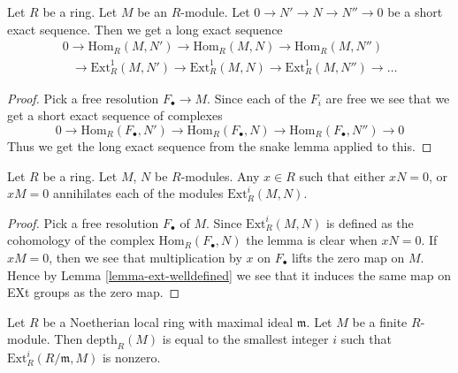 \begin{lemma}
\label{lemma-long-exact-seq-ext}
Let $R$ be a ring. Let $M$ be an $R$-module.
Let $0 \to N' \to N \to N'' \to 0$ be a 
short exact sequence. Then we get a long exact
sequence
$$
\begin{matrix}
0
\to \text{Hom}_R(M, N')
\to \text{Hom}_R(M, N)
\to \text{Hom}_R(M, N'')
\\
\phantom{0\ }
\to \text{Ext}^1_R(M, N')
\to \text{Ext}^1_R(M, N)
\to \text{Ext}^1_R(M, N'')
\to \ldots
\end{matrix}
$$
\end{lemma}

\begin{proof}
Pick a free resolution $F_{\bullet} \to M$.
Since each of the $F_i$ are free we see that 
we get a short exact sequence of complexes
$$
0 \to
\text{Hom}_R(F_{\bullet}, N') \to
\text{Hom}_R(F_{\bullet}, N) \to
\text{Hom}_R(F_{\bullet}, N'') \to
0
$$
Thus we get the long exact sequence from
the snake lemma applied to this.
\end{proof}

\begin{lemma}
\label{lemma-annihilate-ext}
Let $R$ be a ring. Let $M$, $N$ be $R$-modules.
Any $x\in R$ such that either $xN = 0$, or $xM = 0$
annihilates each of the modules $\text{Ext}^i_R(M,N)$.
\end{lemma}

\begin{proof}
Pick a free resolution $F_{\bullet}$ of $M$.
Since $\text{Ext}^i_R(M, N)$
is defined as the cohomology of the complex
$\text{Hom}_R(F_{\bullet}, N)$ the lemma is
clear when $xN = 0$. If $xM = 0$, then 
we see that multiplication by $x$ on $F_{\bullet}$
lifts the zero map on $M$. Hence by Lemma
\ref{lemma-ext-welldefined} we see that it
induces the same map on EXt groups as the
zero map.
\end{proof}

\begin{lemma}
\label{lemma-depth-ext}
Let $R$ be a Noetherian local ring with maximal ideal $\mathfrak m$.
Let $M$ be a finite $R$-module. Then $\text{depth}_R(M)$
is equal to the smallest integer $i$ such that
$\text{Ext}^i_R(R/\mathfrak m, M)$ is nonzero.
\end{lemma}

